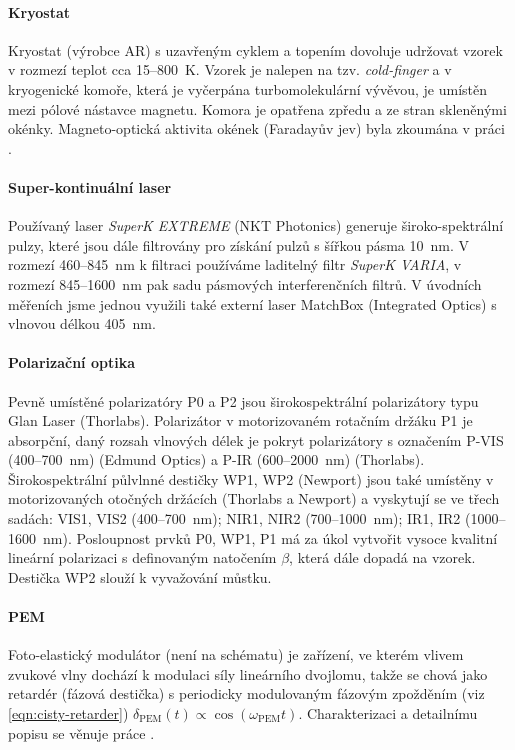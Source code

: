 \paragraph{Kryostat}
Kryostat (výrobce AR) s uzavřeným cyklem a topením dovoluje udržovat vzorek v rozmezí teplot cca 15--\SI{800}{\kelvin}.
Vzorek je nalepen na tzv. \emph{cold-finger} a v kryogenické komoře, která je vyčerpána turbomolekulární vývěvou, je umístěn mezi pólové nástavce magnetu.
Komora je opatřena zpředu a ze stran skleněnými okénky.
Magneto-optická aktivita okének (Faradayův jev) byla zkoumána v práci \cite{baduraMagnetooptickaMereniPro2019}.

\paragraph{Super-kontinuální laser}
Používaný laser \emph{SuperK EXTREME} (NKT Pho\-to\-nics) generuje široko-spektrální pulzy, které jsou dále filtrovány pro získání pulzů s šířkou pásma \SI{10}{\nano\meter}.
V rozmezí \num{460}--\SI{845}{\nano\meter} k filtraci používáme laditelný filtr \emph{SuperK VARIA}, v rozmezí \num{845}--\SI{1600}{\nano\meter} pak sadu pásmových interferenčních filtrů.
V úvodních měřeních jsme jednou využili také externí laser MatchBox (Integrated Optics) s vlnovou délkou \SI{405}{\nano\meter}.

\paragraph{Polarizační optika}
Pevně umístěné polarizatóry P0 a P2 jsou širokospektrální polarizátory typu Glan Laser (Thorlabs).
Polarizátor v motorizovaném rotačním držáku P1 je absorpční, daný rozsah vlnových délek je pokryt polarizátory s označením P-VIS (\num{400}--\SI{700}{\nano\meter}) (Edmund Optics) a P-IR (\num{600}--\SI{2000}{\nano\meter}) (Thorlabs).
Širokospektrální půlvlnné destičky WP1, WP2 (Newport) jsou také umístěny v motorizovaných otočných držácích (Thorlabs a Newport) a vyskytují se ve třech sadách: VIS1, VIS2 (\num{400}--\SI{700}{\nano\meter}); NIR1, NIR2 (\num{700}--\SI{1000}{\nano\meter}); IR1, IR2 (\num{1000}--\SI{1600}{\nano\meter}).
Posloupnost prvků P0, WP1, P1 má za úkol vytvořit vysoce kvalitní lineární polarizaci s definovaným natočením $\beta$, která dále dopadá na vzorek.
Destička WP2 slouží k vyvažování můstku.

\paragraph{PEM}
Foto-elastický modulátor (není na schématu) je zařízení, ve kterém vlivem zvukové vlny dochází k modulaci síly lineárního dvojlomu,
takže se chová jako retardér (fázová destička) s periodicky modulovaným fázovým zpožděním (viz \eqref{eqn:cisty-retarder}) $\delta_\textrm{PEM}(t) \propto \cos(\omega_\textrm{PEM}t)$. 
Charakterizaci a detailnímu popisu se věnuje práce \cite{minarModulacePolarizaceSvetelne2004}.


